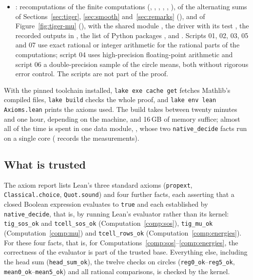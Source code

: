 \documentclass[11pt,reqno]{amsart}
\theoremstyle{definition}
\numberwithin{equation}{section}
\begin{document}
\begin{itemize}
  \item {}: recomputations of the finite computations (, , , , , ), of the alternating sums of Sections~\ref{sec:tiger}, \ref{sec:smooth} and~\ref{sec:remarks} (), and of Figure~\ref{fig:tiger-mu} (), with the shared module , the driver  with its test , the recorded outputs in , the list of Python packages , and . Scripts 01, 02, 03, 05 and 07 use exact rational or integer arithmetic for the rational parts of the computations; script 04 uses high-precision floating-point arithmetic and script 06 a double-precision sample of the circle means, both without rigorous error control. The scripts are not part of the proof.
\end{itemize}
With the pinned toolchain installed, \texttt{lake exe cache get} fetches Mathlib's compiled files, \texttt{lake build} checks the whole proof, and \texttt{lake env lean Axioms.lean} prints the axioms used. The build takes between twenty minutes and one hour, depending on the machine, and 16\,GB of memory suffice; almost all of the time is spent in one data module, , whose two \texttt{native\_decide} facts run on a single core ( records the measurements).

\subsection{What is trusted}
The axiom report lists Lean's three standard axioms (\texttt{propext}, \texttt{Classical.choice}, \texttt{Quot.sound}) and four further facts, each asserting that a closed Boolean expression evaluates to \texttt{true} and each established by \texttt{native\_decide}, that is, by running Lean's evaluator rather than its kernel: \texttt{tig\_sos\_ok} and \texttt{tcell\_sos\_ok} (Computation~\ref{comp:sos}), \texttt{tig\_mu\_ok} (Computation~\ref{comp:mu}) and \texttt{tcell\_rows\_ok} (Computation~\ref{comp:energies}). For these four facts, that is, for Computations~\ref{comp:sos}--\ref{comp:energies}, the correctness of the evaluator is part of the trusted base. Everything else, including the head sum (\texttt{head\_sum\_ok}), the twelve checks on circles (\texttt{reg0\_ok}--\texttt{reg5\_ok}, \texttt{mean0\_ok}--\texttt{mean5\_ok}) and all rational comparisons, is checked by the kernel.
\end{document}
